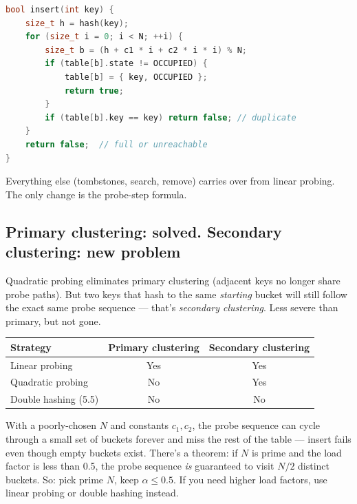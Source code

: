 \documentclass[11pt]{article}
\begin{document}
\begin{examplebox}
\begin{lstlisting}[language=C++,basicstyle=\ttfamily\small,frame=single]
bool insert(int key) {
    size_t h = hash(key);
    for (size_t i = 0; i < N; ++i) {
        size_t b = (h + c1 * i + c2 * i * i) % N;
        if (table[b].state != OCCUPIED) {
            table[b] = { key, OCCUPIED };
            return true;
        }
        if (table[b].key == key) return false; // duplicate
    }
    return false;  // full or unreachable
}
\end{lstlisting}
\end{examplebox}

Everything else (tombstones, search, remove) carries over from
linear probing. The only change is the probe-step formula.

\subsection*{Primary clustering: solved. Secondary clustering: new problem}

Quadratic probing eliminates primary clustering (adjacent keys no
longer share probe paths). But two keys that hash to the same
\emph{starting} bucket will still follow the exact same probe
sequence --- that's \emph{secondary clustering}. Less severe than
primary, but not gone.

\begin{center}
\begin{tabular}{|l|c|c|}
\hline
\textbf{Strategy} & \textbf{Primary clustering} & \textbf{Secondary clustering} \\
\hline
Linear probing    & Yes  & Yes \\
Quadratic probing & No   & Yes \\
Double hashing (5.5) & No & No \\
\hline
\end{tabular}
\end{center}

\begin{warnbox}
With a poorly-chosen $N$ and constants $c_1, c_2$, the probe
sequence can cycle through a small set of buckets forever and
miss the rest of the table --- insert fails even though empty
buckets exist. There's a theorem: if $N$ is prime and the load
factor is less than 0.5, the probe sequence \emph{is} guaranteed
to visit $N/2$ distinct buckets. So: pick prime $N$, keep
$\alpha \leq 0.5$. If you need higher load factors, use linear
probing or double hashing instead.
\end{warnbox}
\end{document}
